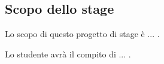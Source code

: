 \subsection{Scopo dello stage}
Lo scopo di questo progetto di stage è ... .

Lo studente avrà il compito di ... .
\textsl{}
